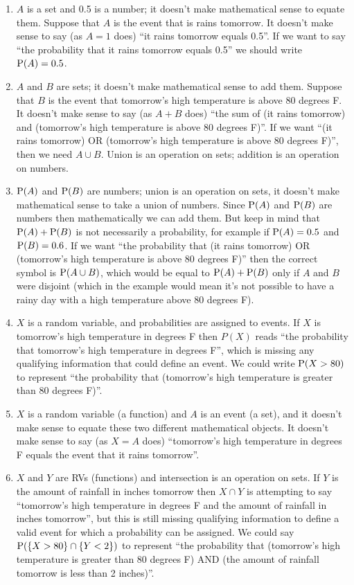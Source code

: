\documentclass[
]{book}
\providecommand{\tightlist}{%
  \setlength{\itemsep}{0pt}\setlength{\parskip}{0pt}}
\theoremstyle{definition}
\theoremstyle{definition}
\theoremstyle{definition}
\theoremstyle{remark}
\begin{document}
\begin{enumerate}
\def\labelenumi{\arabic{enumi}.}
\tightlist
\item
  \(A\) is a set and 0.5 is a number; it doesn't make mathematical sense to equate them. Suppose that \(A\) is the event that is rains tomorrow. It doesn't make sense to say (as \(A=1\) does) ``it rains tomorrow equals 0.5''. If we want to say ``the probability that it rains tomorrow equals 0.5'' we should write \(\textrm{P}(A) = 0.5\).
\item
  \(A\) and \(B\) are sets; it doesn't make mathematical sense to add them. Suppose that \(B\) is the event that tomorrow's high temperature is above 80 degrees F. It doesn't make sense to say (as \(A+B\) does) ``the sum of (it rains tomorrow) and (tomorrow's high temperature is above 80 degrees F)''. If we want ``(it rains tomorrow) OR (tomorrow's high temperature is above 80 degrees F)'', then we need \(A\cup B\). Union is an operation on sets; addition is an operation on numbers.
\item
  \(\textrm{P}(A)\) and \(\textrm{P}(B)\) are numbers; union is an operation on sets, it doesn't make mathematical sense to take a union of numbers. Since \(\textrm{P}(A)\) and \(\textrm{P}(B)\) are numbers then mathematically we can add them. But keep in mind that \(\textrm{P}(A)+\textrm{P}(B)\) is not necessarily a probability, for example if \(\textrm{P}(A)=0.5\) and \(\textrm{P}(B)=0.6\). If we want ``the probability that (it rains tomorrow) OR (tomorrow's high temperature is above 80 degrees F)'' then the correct symbol is \(\textrm{P}(A\cup B)\), which would be equal to \(\textrm{P}(A)+\textrm{P}(B)\) only if \(A\) and \(B\) were disjoint (which in the example would mean it's not possible to have a rainy day with a high temperature above 80 degrees F).
\item
  \(X\) is a random variable, and probabilities are assigned to events. If \(X\) is tomorrow's high temperature in degrees F then \(P(X)\) reads ``the probability that tomorrow's high temperature in degrees F'', which is missing any qualifying information that could define an event. We could write \(\textrm{P}(X>80)\) to represent ``the probability that (tomorrow's high temperature is greater than 80 degrees F)''.
\item
  \(X\) is a random variable (a function) and \(A\) is an event (a set), and it doesn't make sense to equate these two different mathematical objects. It doesn't make sense to say (as \(X=A\) does) ``tomorrow's high temperature in degrees F equals the event that it rains tomorrow''.
\item
  \(X\) and \(Y\) are RVs (functions) and intersection is an operation on sets. If \(Y\) is the amount of rainfall in inches tomorrow then \(X \cap Y\) is attempting to say ``tomorrow's high temperature in degrees F and the amount of rainfall in inches tomorrow'', but this is still missing qualifying information to define a valid event for which a probability can be assigned. We could say \(\textrm{P}(\{X > 80\} \cap \{Y < 2\})\) to represent ``the probability that (tomorrow's high temperature is greater than 80 degrees F) AND (the amount of rainfall tomorrow is less than 2 inches)''.
\end{enumerate}
\end{document}
